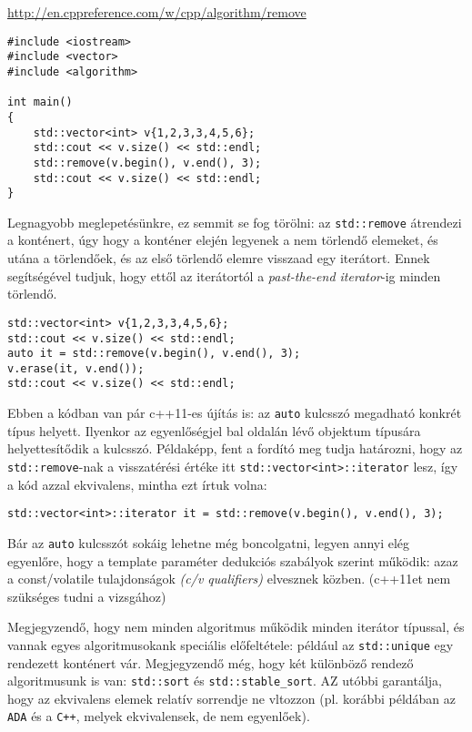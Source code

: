 \documentclass[a4paper,11.5pt]{article}
\begin{document}
	\url{http://en.cppreference.com/w/cpp/algorithm/remove}
	\begin{lstlisting}
#include <iostream>
#include <vector>
#include <algorithm>

int main()
{
	std::vector<int> v{1,2,3,3,4,5,6};
	std::cout << v.size() << std::endl;
	std::remove(v.begin(), v.end(), 3);
	std::cout << v.size() << std::endl;
}
	\end{lstlisting}
	Legnagyobb meglepetésünkre, ez semmit se fog törölni: az \texttt{std::remove} átrendezi a konténert, úgy hogy a konténer elején legyenek a nem törlendő elemeket, és utána a törlendőek, és az első törlendő elemre visszaad egy iterátort. Ennek segítségével tudjuk, hogy ettől az iterátortól a \textit{past-the-end iterator}-ig minden törlendő.
	\begin{lstlisting}
std::vector<int> v{1,2,3,3,4,5,6};
std::cout << v.size() << std::endl;
auto it = std::remove(v.begin(), v.end(), 3);
v.erase(it, v.end());
std::cout << v.size() << std::endl;
	\end{lstlisting}
	\begin{note}
		Ebben a kódban van pár c++11-es újítás is: az \texttt{auto} kulcsszó megadható konkrét típus helyett. Ilyenkor az egyenlőségjel bal oldalán lévő objektum típusára helyettesítődik a kulcsszó. Példaképp, fent a fordító meg tudja határozni, hogy az \texttt{std::remove}-nak a visszatérési értéke itt \texttt{std::vector<int>::iterator} lesz, így a kód azzal ekvivalens, mintha ezt írtuk volna:
		
		{\centering\texttt{std::vector<int>::iterator it = std::remove(v.begin(), v.end(), 3);} \par}
		
		Bár az \texttt{auto} kulcsszót sokáig lehetne még boncolgatni, legyen annyi elég egyenlőre, hogy a template paraméter dedukciós szabályok szerint működik: azaz a const/volatile tulajdonságok \textit{(c/v qualifiers)} elvesznek közben. (c++11et nem szükséges tudni a vizsgához)
	\end{note}
	
	\medskip
	Megjegyzendő, hogy nem minden algoritmus működik minden iterátor típussal, és vannak egyes algoritmusokank speciális előfeltétele: például az \texttt{std::unique} egy rendezett konténert vár. Megjegyzendő még, hogy két különböző rendező algoritmusunk is van: \texttt{std::sort} és \texttt{std::stable\_sort}. AZ utóbbi garantálja, hogy az ekvivalens elemek relatív sorrendje ne vltozzon (pl. korábbi példában az \texttt{ADA} és a \texttt{C++}, melyek ekvivalensek, de nem egyenlőek).
	
\end{document}
